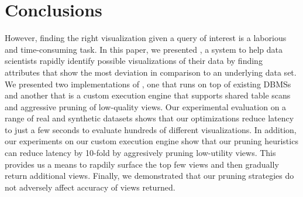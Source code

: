 
\section{Conclusions}
\label{sec:conc}

However, finding the right visualization given a query of interest is a
laborious and time-consuming task.
In this paper, we presented \VizRecDB, a system to help data scientists 
rapidly identify possible visualizations of their data by finding
attributes that show the most deviation in comparison to an underlying data set.
We presented two implementations of \VizRecDB, one that runs on top of existing
DBMSs and another that is a custom execution engine that supports shared table scans
and aggressive pruning of low-quality views.
Our experimental evaluation on a range of real and synthetic datasets shows that
our optimizations reduce latency to just a few seconds to evaluate hundreds of different
visualizations.
In addition, our experiments on our custom execution engine show that our pruning
heuristics can reduce latency by 10-fold by aggresively pruning low-utility views.
This provides us a means to rapdily surface the top few views and then
gradually return additional views.
Finally, we demonstrated that our pruning
strategies do not adversely affect accuracy of views returned.